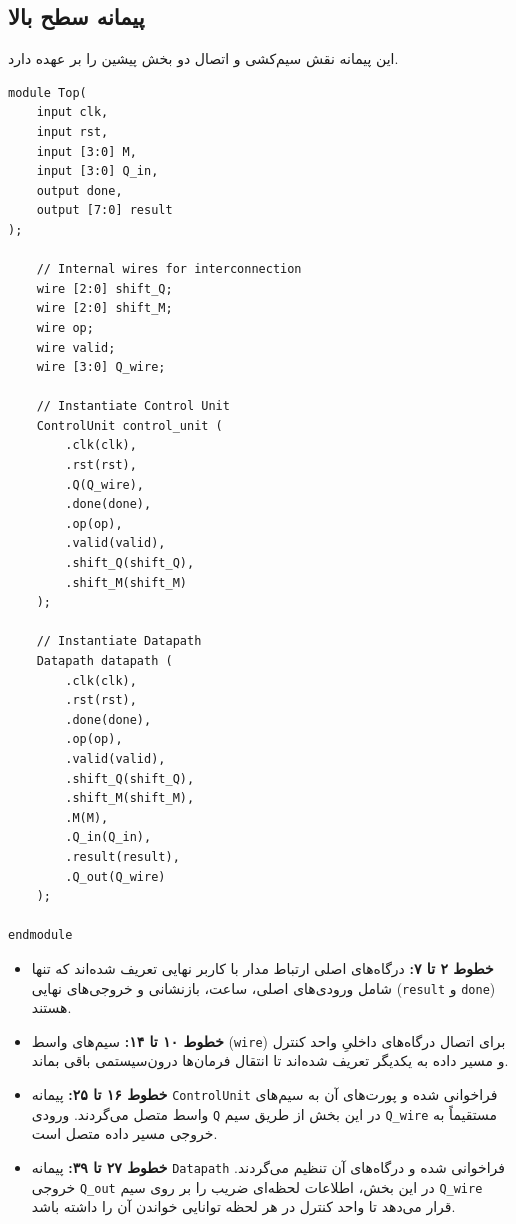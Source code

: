 \documentclass[11pt,a4paper]{article}
\begin{document}
\subsection{پیمانه سطح بالا}
این پیمانه نقش سیم‌کشی و اتصال دو بخش پیشین را بر عهده دارد.

\begin{LTR}
\begin{lstlisting}[title={\rl{کد پیمانه سطح بالا}}]
module Top(
    input clk,
    input rst,
    input [3:0] M,
    input [3:0] Q_in,
    output done,
    output [7:0] result
);

    // Internal wires for interconnection
    wire [2:0] shift_Q;
    wire [2:0] shift_M;
    wire op;
    wire valid; 
    wire [3:0] Q_wire;  

    // Instantiate Control Unit
    ControlUnit control_unit (
        .clk(clk),
        .rst(rst),
        .Q(Q_wire),
        .done(done),
        .op(op),
        .valid(valid),
        .shift_Q(shift_Q),
        .shift_M(shift_M)
    );

    // Instantiate Datapath
    Datapath datapath (
        .clk(clk),
        .rst(rst),
        .done(done),
        .op(op),
        .valid(valid),
        .shift_Q(shift_Q),
        .shift_M(shift_M),
        .M(M),
        .Q_in(Q_in),
        .result(result),
        .Q_out(Q_wire) 
    );
    
endmodule
\end{lstlisting}
\end{LTR}

\begin{itemize}
    \item \textbf{خطوط ۲ تا ۷:} درگاه‌های اصلی ارتباط مدار با کاربر نهایی تعریف شده‌اند که تنها شامل ورودی‌های اصلی، ساعت، بازنشانی و خروجی‌های نهایی (\verb|result| و \verb|done|) هستند.
    \item \textbf{خطوط ۱۰ تا ۱۴:} سیم‌های واسط (\verb|wire|) برای اتصال درگاه‌های داخلیِ واحد کنترل و مسیر داده به یکدیگر تعریف شده‌اند تا انتقال فرمان‌ها درون‌سیستمی باقی بماند.
    \item \textbf{خطوط ۱۶ تا ۲۵:} پیمانه \verb|ControlUnit| فراخوانی شده و پورت‌های آن به سیم‌های واسط متصل می‌گردند. ورودی \verb|Q| در این بخش از طریق سیم \verb|Q_wire| مستقیماً به خروجی مسیر داده متصل است.
    \item \textbf{خطوط ۲۷ تا ۳۹:} پیمانه \verb|Datapath| فراخوانی شده و درگاه‌های آن تنظیم می‌گردند. خروجی \verb|Q_out| در این بخش، اطلاعات لحظه‌ای ضریب را بر روی سیم \verb|Q_wire| قرار می‌دهد تا واحد کنترل در هر لحظه توانایی خواندن آن را داشته باشد.
\end{itemize}
\end{document}
